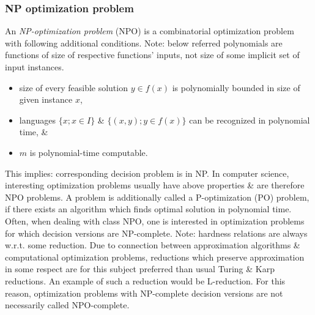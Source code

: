 \documentclass{article}
\begin{document}

\subsubsection{NP optimization problem}
An {\it NP-optimization problem} (NPO) is a combinatorial optimization problem with following additional conditions. Note: below referred polynomials are functions of size of respective functions' inputs, not size of some implicit set of input instances.
\begin{itemize}
    \item size of every feasible solution $y\in f(x)$ is polynomially bounded in size of given instance $x$,
    \item languages $\{x;x\in I\}$ \& $\{(x,y);y\in f(x)\}$ can be recognized in polynomial time, \&
    \item $m$ is polynomial-time computable.
\end{itemize}
This implies: corresponding decision problem is in NP. In computer science, interesting optimization problems usually have above properties \& are therefore NPO problems. A problem is additionally called a P-optimization (PO) problem, if there exists an algorithm which finds optimal solution in polynomial time. Often, when dealing with class NPO, one is interested in optimization problems for which decision versions are NP-complete. Note: hardness relations are always w.r.t. some reduction. Due to connection between approximation algorithms \& computational optimization problems, reductions which preserve approximation in some respect are for this subject preferred than usual Turing \& Karp reductions. An example of such a reduction would be L-reduction. For this reason, optimization problems with NP-complete decision versions are not necessarily called NPO-complete.
\end{document}
